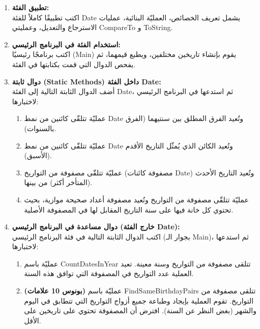\documentclass[14pt]{extarticle}
\begin{document}
\clearpage

\begin{enumerate}[label=\textbf{\arabic*.}]
    \item \textbf{تطبيق الفئة:} \\
    اكتب تطبيقًا كاملاً للفئة \textenglish{Date} يشمل تعريف الخصائص، العمليّة البنائية، عمليات الاسترجاع والتعديل، وعمليتي \textenglish{CompareTo} و \textenglish{ToString}.

    \item \textbf{استخدام الفئة في البرنامج الرئيسي:} \\
    اكتب برنامجًا رئيسيًا (\textenglish{Main}) يقوم بإنشاء تاريخين مختلفين، ويطبع قيمهما، ثم يفحص الدوال التي قمت بكتابتها في الفئة.

    \item \textbf{دوال ثابتة (\textenglish{Static Methods}) داخل الفئة \textenglish{Date}:} \\
    أضف الدوال الثابتة التالية إلى الفئة \textenglish{Date}، ثم استدعها في البرنامج الرئيسي لاختبارها:
    \begin{enumerate}[label=\textbf{\alph*)}]
        \item عمليّة تتلقّى كائنين من نمط \textenglish{Date} وتُعيد الفرق المطلق بين سنتيهما (الفرق بالسنوات).
        \item عمليّة تتلقّى كائنين من نمط \textenglish{Date} وتُعيد الكائن الذي يُمثّل التاريخ الأقدم (الأسبق).
        \item عمليّة تتلقّى مصفوفة من التواريخ (مصفوفة كائنات \textenglish{Date}) وتُعيد التاريخ الأحدث (المتأخر أكثر) من بينها.
        \item عمليّة تتلقّى مصفوفة من التواريخ وتُعيد مصفوفة أعداد صحيحة موازية، بحيث تحتوي كل خانة فيها على سنة التاريخ المقابل لها في المصفوفة الأصلية.
    \end{enumerate}

    \item \textbf{دوال مساعدة في البرنامج الرئيسي (خارج الفئة \textenglish{Date}):} \\
    اكتب الدوال الثابتة التالية في فئة البرنامج الرئيسي (بجوار الـ \textenglish{Main})، ثم استدعها لاختبارها:
    \begin{enumerate}[label=\textbf{\alph*)}]
        \item عمليّة باسم \textenglish{CountDatesInYear} تتلقى مصفوفة من التواريخ وسنة معينة. تعيد العملية عدد التواريخ في المصفوفة التي توافق هذه السنة.
        \item \textbf{(بونوس 10 علامات)} عمليّة باسم \textenglish{FindSameBirthdayPairs} تتلقى مصفوفة من التواريخ. تقوم العملية بإيجاد وطباعة جميع أزواج التواريخ التي تتطابق في اليوم والشهر (بغض النظر عن السنة). افترض أن المصفوفة تحتوي على تاريخين على الأقل.
    \end{enumerate}

\end{enumerate}
\end{document}

